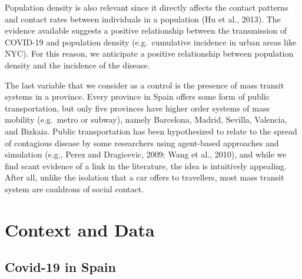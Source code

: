 \documentclass[]{elsarticle} %
\begin{document}
Population density is also relevant since it directly affects the
contact patterns and contact rates between individuals in a population
(Hu et al., 2013). The evidence available suggests a positive
relationship between the transmission of COVID-19 and population density
(e.g.~cumulative incidence in urban areas like NYC). For this reason, we
anticipate a positive relationship between population density and the
incidence of the disease.

The last variable that we consider as a control is the presence of mass
transit systems in a province. Every province in Spain offers some form
of public transportation, but only five provinces have higher order
systems of mass mobility (e.g.~metro or subway), namely Barcelona,
Madrid, Sevilla, Valencia, and Bizkaia. Public transportation has been
hypothesized to relate to the spread of contagious disease by some
researchers using agent-based approaches and simulation (e.g., Perez and
Dragicevic, 2009; Wang et al., 2010), and while we find scant evidence
of a link in the literature, the idea is intuitively appealing. After
all, unlike the isolation that a car offers to travellers, most mass
transit system are cauldrons of social contact.

\hypertarget{context-and-data}{%
\section{Context and Data}\label{context-and-data}}

\hypertarget{covid-19-in-spain}{%
\subsection{Covid-19 in Spain}\label{covid-19-in-spain}}
\end{document}
